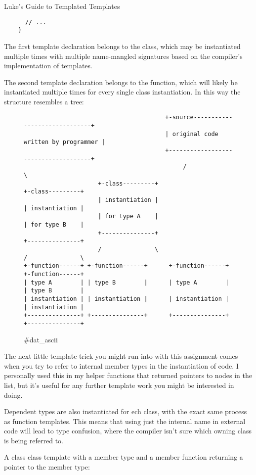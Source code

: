 \begin{section}{Luke's Guide to Templated Templates}
\begin{verbatim}
      // ...
    }
 \end{verbatim}


 \indent The first template declaration belongs to the class, which may be instantiated
 multiple times with multiple name-mangled signatures based on the compiler's
 implementation of templates.

 \indent The second template declaration belongs to the function, which will likely be
 instantiated multiple times for every single class instantiation. In this way
 the structure resembles a tree:


 \begin{figure}[h]
	 \centering
	 \begin{verbatim}
										+-source------------------------------+
										| original code written by programmer |
										+-------------------------------------+
											 /                               \
					 +-class---------+                     +-class---------+
					 | instantiation |                     | instantiation |
					 | for type A    |                     | for type B    |
					 +---------------+                     +---------------+
					 /               \                     /               \
+-function------+ +-function------+      +-function------+ +-function------+
| type A        | | type B        |      | type A        | | type B        |
| instantiation | | instantiation |      | instantiation | | instantiation |
+---------------+ +---------------+      +---------------+ +---------------+
	\end{verbatim}
	 \caption{\#dat\_ascii}
 \end{figure}



 \pagebreak
 \indent The next little template trick you might run into with this assignment comes
 when you try to refer to internal member types in the instantiation of code.
 I personally used this in my helper functions that returned pointers to nodes
 in the list, but it's useful for any further template work you might be
 interested in doing.

 \indent Dependent types are also instantiated for ech class, with the exact same
 process as function templates. This means that using just the internal name
 in external code will lead to type confusion, where the compiler isn't sure
 which owning class is being referred to.

 \indent A class class template with a member type and a member function returning a
 pointer to the member type:


\end{section}
